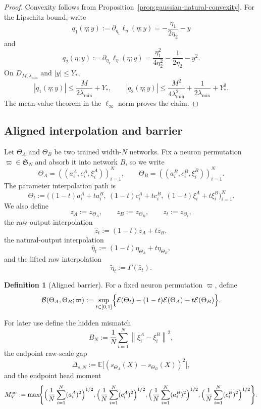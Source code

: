\documentclass[11pt]{article}
\theoremstyle{definition}
\newtheorem{definition}[theorem]{Definition}
\newcommand{\E}{\mathbb{E}}
\newcommand{\norm}[1]{\left\lVert #1 \right\rVert}
\newcommand{\cE}{\mathcal{E}}
\newcommand{\cB}{\mathcal{B}}
\begin{document}
\begin{proof}
Convexity follows from Proposition~\ref{prop:gaussian-natural-convexity}.
For the Lipschitz bound, write
\[
  q_1(\eta;y)
  :=
  \partial_{\eta_1}\ell_\eta(\eta;y)
  =
  -\frac{\eta_1}{2\eta_2}-y
\]
and
\[
  q_2(\eta;y)
  :=
  \partial_{\eta_2}\ell_\eta(\eta;y)
  =
  \frac{\eta_1^2}{4\eta_2^2}
  -
  \frac{1}{2\eta_2}
  -
  y^2.
\]
On $D_{M,\lambda_{\min}}$ and $|y|\le Y_\ast$,
\[
  |q_1(\eta;y)|
  \le
  \frac{M}{2\lambda_{\min}}+Y_\ast,
  \qquad
  |q_2(\eta;y)|
  \le
  \frac{M^2}{4\lambda_{\min}^2}
  +
  \frac{1}{2\lambda_{\min}}
  +
  Y_\ast^2.
\]
The mean-value theorem in the $\ell_\infty$ norm proves the claim.
\end{proof}

\subsection{Aligned interpolation and barrier}

Let $\Theta_A$ and $\Theta_B$ be two trained width-$N$ networks. Fix a neuron
permutation $\varpi\in\mathfrak S_N$ and absorb it into network $B$, so we write
\[
  \Theta_A=((a_i^A,c_i^A,\xi_i^A))_{i=1}^N,
  \qquad
  \Theta_B=((a_i^B,c_i^B,\xi_i^B))_{i=1}^N.
\]
The parameter interpolation path is
\[
  \Theta_t
  :=
  \bigl((1-t)a_i^A+ta_i^B,\ (1-t)c_i^A+tc_i^B,\ (1-t)\xi_i^A+t\xi_i^B\bigr)_{i=1}^N.
\]
We also define
\[
  z_A:=z_{\Theta_A},
  \qquad
  z_B:=z_{\Theta_B},
  \qquad
  z_t:=z_{\Theta_t},
\]
the raw-output interpolation
\[
  \hat z_t:=(1-t)z_A+tz_B,
\]
the natural-output interpolation
\[
  \hat\eta_t:=(1-t)\eta_{\Theta_A}+t\eta_{\Theta_B},
\]
and the lifted raw interpolation
\[
  \tilde\eta_t:=\Gamma(\hat z_t).
\]

\begin{definition}[Aligned barrier]
For a fixed neuron permutation $\varpi$, define
\[
  \cB(\Theta_A,\Theta_B;\varpi)
  :=
  \sup_{t\in[0,1]}
  \Bigl\{
    \cE(\Theta_t)
    -
    (1-t)\cE(\Theta_A)
    -
    t\cE(\Theta_B)
  \Bigr\}.
\]
\end{definition}

For later use define the hidden mismatch
\begin{equation}
  B_N
  :=
  \frac1N\sum_{i=1}^N \norm{\xi_i^A-\xi_i^B}^2,
  \label{eq:hidden_mismatch_k1}
\end{equation}
the endpoint raw-scale gap
\begin{equation}
  \Delta_{s,N}
  :=
  \E\big[(s_{\Theta_A}(X)-s_{\Theta_B}(X))^2\big],
  \label{eq:raw_scale_gap}
\end{equation}
and the endpoint head moment
\begin{equation}
  M_V^\infty
  :=
  \max\!\Biggl\{
    \Bigl(\frac1N\sum_{i=1}^N (a_i^A)^2\Bigr)^{1/2},
    \Bigl(\frac1N\sum_{i=1}^N (c_i^A)^2\Bigr)^{1/2},
    \Bigl(\frac1N\sum_{i=1}^N (a_i^B)^2\Bigr)^{1/2},
    \Bigl(\frac1N\sum_{i=1}^N (c_i^B)^2\Bigr)^{1/2}
  \Biggr\}.
  \label{eq:head_moment_k1}
\end{equation}
\end{document}
